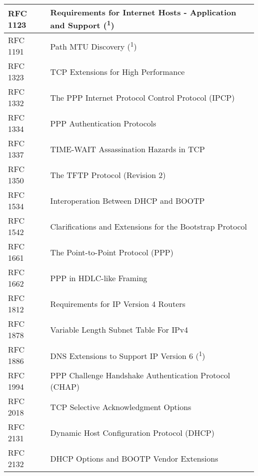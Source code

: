 \begin{longtable}{ | l | p{15cm} | }
RFC 1123 &
Requirements for Internet Hosts - Application and Support (\textsuperscript{1}) \\ \hline

RFC 1191 &
Path MTU Discovery (\textsuperscript{1})\\ \hline

RFC 1323 &
TCP Extensions for High Performance \\ \hline

RFC 1332 &
The PPP Internet Protocol Control Protocol (IPCP) \\ \hline

RFC 1334 &
PPP Authentication Protocols \\ \hline

RFC 1337 &
TIME-WAIT Assassination Hazards in TCP \\ \hline

RFC 1350 &
The TFTP Protocol (Revision 2) \\ \hline

RFC 1534 &
Interoperation Between DHCP and BOOTP \\ \hline

RFC 1542 &
Clarifications and Extensions for the Bootstrap Protocol \\ \hline

RFC 1661 &
The Point-to-Point Protocol (PPP) \\ \hline

RFC 1662 &
PPP in HDLC-like Framing \\ \hline

RFC 1812 &
Requirements for IP Version 4 Routers \\ \hline

RFC 1878 &
Variable Length Subnet Table For IPv4 \\ \hline

RFC 1886 &
DNS Extensions to Support IP Version 6 (\textsuperscript{1}) \\ \hline

RFC 1994 &
PPP Challenge Handshake Authentication Protocol (CHAP) \\ \hline

RFC 2018 &
TCP Selective Acknowledgment Options \\ \hline

RFC 2131 &
Dynamic Host Configuration Protocol (DHCP) \\ \hline

RFC 2132 &
DHCP Options and BOOTP Vendor Extensions \\ \hline


\end{longtable}
